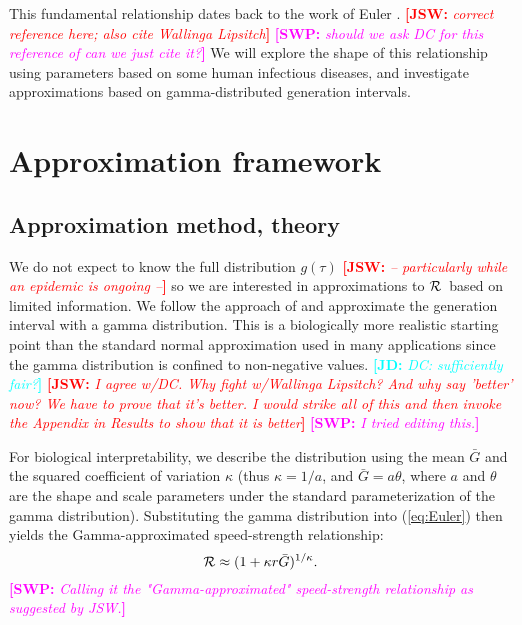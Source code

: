 \documentclass[12pt]{article}
\newcommand{\RR}{\ensuremath{{\cal R}}}
\newcommand{\eref}[1]{(\ref{eq:#1})}
\newcommand{\comment}[3]{\textcolor{#1}{\textbf{[#2: }\textit{#3}\textbf{]}}}
\newcommand{\jd}[1]{\comment{cyan}{JD}{#1}}
\newcommand{\swp}[1]{\comment{magenta}{SWP}{#1}}
\newcommand{\jsw}[1]{\comment{red}{JSW}{#1}}
\begin{document}
This fundamental relationship dates back to the work of Euler \cite{Euler}. \jsw{correct reference here; also cite Wallinga Lipsitch} \swp{should we ask DC for this reference of can we just cite it?}
We will explore the shape of this relationship using parameters based on some human infectious diseases, and investigate approximations based on gamma-distributed generation intervals.

\section{Approximation framework}

\subsection{Approximation method, theory}

We do not expect to know the full distribution $g(\tau)$ \jsw{-- particularly while an epidemic is ongoing --} so we are interested in approximations to \RR\ based on limited information.
We follow the approach of \cite{NishCast09} and approximate the generation interval with a gamma distribution.
This is a biologically more realistic starting point than the standard normal approximation used in many applications since the gamma distribution is confined to non-negative values.
\jd{DC: sufficiently fair?}
\jsw{I agree w/DC. Why fight w/Wallinga Lipsitch? And why say 'better' now? We have to prove that it's better. I would strike all of this and then invoke the Appendix in Results to show that it is better}
\swp{I tried editing this.}

For biological interpretability, we describe the distribution using the mean $\bar G$ and the squared coefficient of variation $\kappa$ (thus $\kappa = 1/a$, and $\bar G = a\theta$, where $a$ and $\theta$ are the shape and scale parameters under the standard parameterization of the gamma distribution).
Substituting the gamma distribution into \eref{Euler} then yields the Gamma-approximated speed-strength relationship:
\begin{equation}
	\RR \approx (1 + \kappa r \bar G)^{1/\kappa}.
	\label{eq:gamApp}
\end{equation}
\swp{Calling it the "Gamma-approximated" speed-strength relationship as suggested by JSW.}
\end{document}
